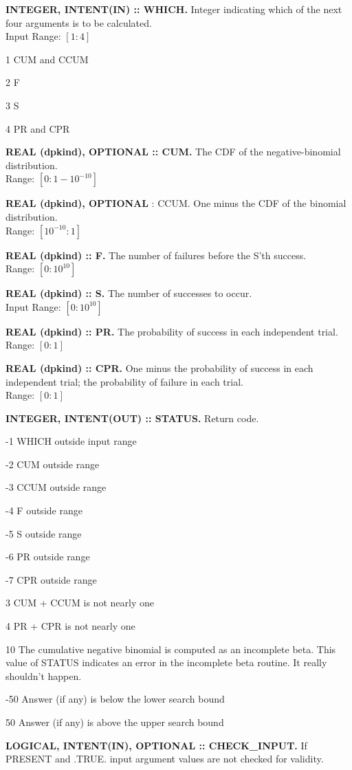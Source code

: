 \documentclass[12pt,dvips]{article}
\newcommand{\range}[2]{\hfill Range: \ensuremath{\left[ #1:#2
\right]}\\}
\newcommand{\inrange}[2]{\hfill Input Range: \ensuremath{\left[ #1:#2
\right]}\\}
\newcommand{\sprob}{10^{-10}}
\newcommand{\bprob}{1-\sprob}
\newcommand{\bbig}{10^10}
\newcommand{\myitem}[1]{\item{\bf \color{Violet} #1 \normalcolor}}
\begin{document}
\begin{description}

\myitem{INTEGER, INTENT(IN)  :: WHICH.} Integer indicating  which of the
next four arguments is to be calculated.\\
\inrange{1}{4}
\begin{description}
\item{1} CUM and CCUM
\item{2} F
\item{3} S
\item{4} PR and CPR
\end{description}

\myitem{REAL (dpkind), OPTIONAL :: CUM.} The CDF of the negative-binomial
distribution.\\
\range{0}{\bprob}

\myitem{REAL (dpkind), OPTIONAL }{: CCUM.} One minus the CDF of the
binomial distribution.\\
\range{\sprob}{1}

\myitem{REAL (dpkind) :: F.}  The number of failures before the S'th success.\\
\range{0}{\bbig}

\myitem{REAL (dpkind) :: S.}  The number of successes to occur.\\
\inrange{0}{\bbig}

\myitem{REAL  (dpkind)  :: PR.}   The  probability  of  success in  each
independent trial.\\
\range{0}{1}

\myitem{REAL (dpkind) :: CPR.}  One  minus the probability of success in
each  independent trial;  the probability  of failure  in  each trial.\\
\range{0}{1}

\myitem{INTEGER, INTENT(OUT) :: STATUS.} Return code.
\begin{description}
\item{-1}  WHICH outside input range
\item{-2}  CUM outside range
\item{-3}  CCUM outside range
\item{-4}  F outside range
\item{-5}  S outside range
\item{-6}  PR outside range
\item{-7}  CPR outside range
\item{3} CUM + CCUM is not nearly one
\item{4} PR + CPR is not nearly one
\item{10} The cumulative negative binomial is computed as an
  incomplete beta.  This value of STATUS indicates an error in the
  incomplete beta routine.  It really shouldn't happen.
\item{-50} Answer (if any) is below the lower search bound
\item{50} Answer (if any) is above the upper search bound
\end{description}

\myitem{LOGICAL, INTENT(IN), OPTIONAL :: CHECK\_INPUT.}  If PRESENT
and .TRUE. input argument values are not checked for validity.

\end{description}
\end{document}
